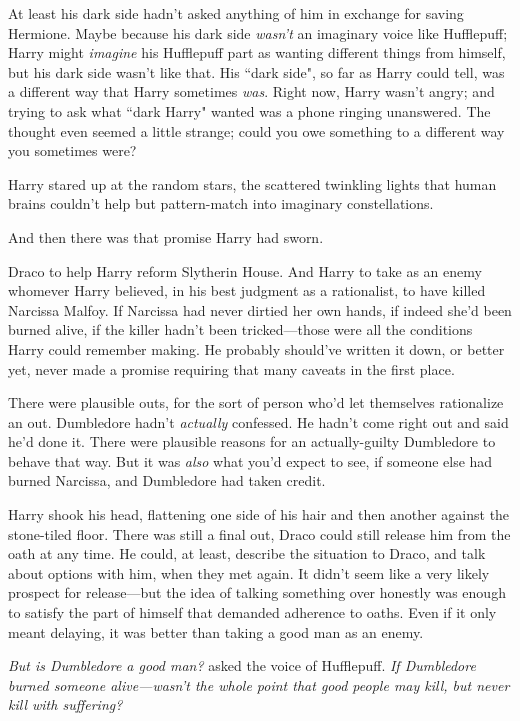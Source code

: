 At least his dark side hadn't asked anything of him in exchange for saving Hermione. Maybe because his dark side \emph{wasn't} an imaginary voice like Hufflepuff; Harry might \emph{imagine} his Hufflepuff part as wanting different things from himself, but his dark side wasn't like that. His ``dark side", so far as Harry could tell, was a different way that Harry sometimes \emph{was}. Right now, Harry wasn't angry; and trying to ask what ``dark Harry" wanted was a phone ringing unanswered. The thought even seemed a little strange; could you owe something to a different way you sometimes were?

Harry stared up at the random stars, the scattered twinkling lights that human brains couldn't help but pattern-match into imaginary constellations.

And then there was that promise Harry had sworn.

Draco to help Harry reform Slytherin House. And Harry to take as an enemy whomever Harry believed, in his best judgment as a rationalist, to have killed Narcissa Malfoy. If Narcissa had never dirtied her own hands, if indeed she'd been burned alive, if the killer hadn't been tricked---those were all the conditions Harry could remember making. He probably should've written it down, or better yet, never made a promise requiring that many caveats in the first place.

There were plausible outs, for the sort of person who'd let themselves rationalize an out. Dumbledore hadn't \emph{actually} confessed. He hadn't come right out and said he'd done it. There were plausible reasons for an actually-guilty Dumbledore to behave that way. But it was \emph{also} what you'd expect to see, if someone else had burned Narcissa, and Dumbledore had taken credit.

Harry shook his head, flattening one side of his hair and then another against the stone-tiled floor. There was still a final out, Draco could still release him from the oath at any time. He could, at least, describe the situation to Draco, and talk about options with him, when they met again. It didn't seem like a very likely prospect for release---but the idea of talking something over honestly was enough to satisfy the part of himself that demanded adherence to oaths. Even if it only meant delaying, it was better than taking a good man as an enemy.

\emph{But \emph{is} Dumbledore a good man?} asked the voice of Hufflepuff. \emph{If Dumbledore burned someone alive---wasn't the whole point that good people may kill, but never kill with suffering?}

